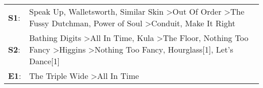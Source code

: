 \begin{supertabular}{p{0.03\textwidth}p{0.92\textwidth}}
 \textbf{S1}:  &                                                     Speak Up\textsuperscript{}, \enspace Walletsworth\textsuperscript{}, \enspace Similar Skin\textsuperscript{} \textgreater \enspace Out Of Order\textsuperscript{} \textgreater \enspace The Fussy Dutchman\textsuperscript{}, \enspace Power of Soul\textsuperscript{} \textgreater \enspace Conduit\textsuperscript{}, \enspace Make It Right\textsuperscript{}  \enspace  \\
 \textbf{S2}:  &  Bathing Digits\textsuperscript{} \textgreater \enspace All In Time\textsuperscript{}, \enspace Kula\textsuperscript{} \textgreater \enspace The Floor\textsuperscript{}, \enspace Nothing Too Fancy\textsuperscript{} \textgreater \enspace Higgins\textsuperscript{} \textgreater \enspace Nothing Too Fancy\textsuperscript{}, \enspace Hourglass[1]\textsuperscript{}, \enspace Let's Dance[1]\textsuperscript{}  \enspace  \\
 \textbf{E1}:  &                                                                                                                                                                                                                                                                                                                                The Triple Wide\textsuperscript{} \textgreater \enspace All In Time\textsuperscript{}  \enspace  \\
\end{supertabular}
